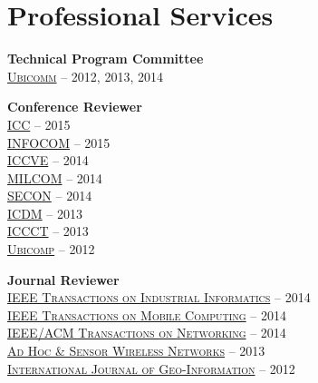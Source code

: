 \section{\sc Professional Services}
{\bf Technical Program Committee}\\
{\href{http://www.iaria.org/conferences.html}{\textsc{Ubicomm}}} -- 2012, 2013, 2014

{\bf Conference Reviewer}\\
{\href{http://icc2015.ieee-icc.org/}{\textsc{ICC}}} -- 2015\\
{\href{http://infocom2015.ieee-infocom.org/}{\textsc{INFOCOM}}} -- 2015\\
{\href{http://www.iccve.org/2014/}{\textsc{ICCVE}}} -- 2014\\
{\href{http://www.milcom.org/2014/}{\textsc{MILCOM}}} -- 2014\\
{\href{http://secon2014.ieee-secon.org}{\textsc{SECON}}} -- 2014\\
{\href{http://icdm2013.rutgers.edu}{\textsc{ICDM}}} -- 2013\\
{\href{http://www.mnnit.ac.in/iccct2013}{\textsc{ICCCT}}} -- 2013\\
{\href{http://www.ubicomp.org/ubicomp2012}{\textsc{Ubicomp}}} -- 2012

{\bf Journal Reviewer}\\
{\href{http://tii.ieee-ies.org}{\textsc{IEEE Transactions on Industrial Informatics}}} -- 2014\\
{\href{http://www.computer.org/portal/web/tmc}{\textsc{IEEE Transactions on Mobile Computing}}} -- 2014\\
{\href{http://www.ifp.illinois.edu/ton}{\textsc{IEEE/ACM Transactions on Networking}}} -- 2014\\
{\href{http://www.oldcitypublishing.com/AHSWN/AHSWN.html}{\textsc{Ad Hoc \& Sensor Wireless Networks}}} -- 2013\\
{\href{http://www.mdpi.com/journal/ijgi}{\textsc{International Journal of Geo-Information}}} -- 2012
